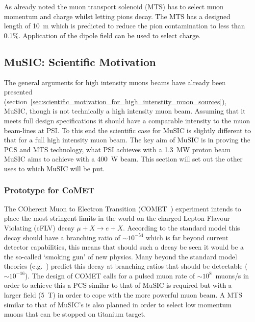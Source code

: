 As already noted the muon transport solenoid (MTS) has to select muon momentum and charge whilst letting pions decay. The MTS has a designed length of 10~m which is predicted to reduce the pion contamination to less than 0.1\%. Application of the dipole field can be used to select charge.

\subsection{MuSIC: Scientific Motivation} %
\label{sec:music_scientific_motivation}
The general arguments for high intensity muons beams have already been presented (section~\ref{sec:scientific_motivation_for_high_intenstity_muon_sources}), MuSIC, though is not technically a high intensity muon beam. Assuming that it meets full design specifications it should have a comparable intensity to the muon beam-lines at PSI. To this end the scientific case for MuSIC is slightly different to that for a full high intensity muon beam. The key aim of MuSIC is in proving the PCS and MTS technology, what PSI achieves with a 1.3~MW proton beam MuSIC aims to achieve with a 400~W beam. This section will set out the other uses to which MuSIC will be put.

\subsubsection{Prototype for CoMET} %
\label{sub:prototype_for_comet}
The COherent Muon to Electron Transition (COMET~\cite{comet_cdr}) experiment intends to place the most stringent limits in the world on the charged Lepton Flavour Violating (cFLV) decay \( \mu + X \rightarrow e + X \). According to the standard model this decay should have a branching ratio of \( \sim 10^{-54} \) which is far beyond current detector capabilities, this means that should such a decay be seen it would be a the so-called `smoking gun' of new physics. Many beyond the standard model theories (e.g.\ \cite{clfv_in_susy}) predict this decay at branching ratios that should be detectable (\(\sim 10^{-16}\)). The design of COMET calls for a pulsed muon rate of \( \sim 10^8 \)~muons/s in order to achieve this a PCS similar to that of MuSIC is required but with a larger field (5~T) in order to cope with the more powerful muon beam. A MTS similar to that of MuSIC's is also planned in order to select low momentum muons that can be stopped on titanium target.

